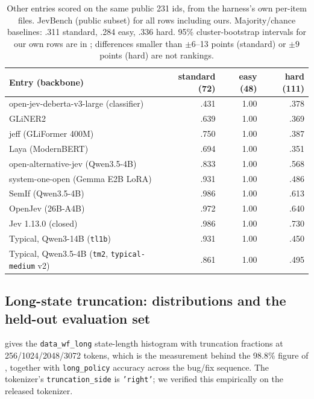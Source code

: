 \begin{table}[h]
  \centering
  \caption{Other entries scored on the same public 231 ids, from the harness's own per-item files.
  JevBench (public subset) for all rows including ours. Majority/chance baselines: .311
  standard, .284 easy, .336 hard. 95\% cluster-bootstrap intervals for our own rows are in
  ; differences smaller than $\pm6$--13 points (standard) or $\pm9$ points
  (hard) are not rankings.}
  \label{tab:app-leaderboard}
  \small
  \begin{tabular}{lrrr}
    \toprule
    Entry (backbone) & standard (72) & easy (48) & hard (111) \\
    \midrule
    open-jev-deberta-v3-large (classifier) & .431 & 1.00 & .378 \\
    GLiNER2 & .639 & 1.00 & .369 \\
    jeff (GLiFormer 400M) & .750 & 1.00 & .387 \\
    Laya (ModernBERT) & .694 & 1.00 & .351 \\
    open-alternative-jev (Qwen3.5-4B) & .833 & 1.00 & .568 \\
    system-one-open (Gemma E2B LoRA) & .931 & 1.00 & .486 \\
    SemIf (Qwen3.5-4B) & .986 & 1.00 & .613 \\
    OpenJev (26B-A4B) & .972 & 1.00 & .640 \\
    Jev 1.13.0 (closed) & .986 & 1.00 & .730 \\
    \midrule
    Typical, Qwen3-14B (\texttt{tl1b}) & .931 & 1.00 & .450 \\
    Typical, Qwen3.5-4B (\texttt{tm2}, \texttt{typical-medium} v2) & .861 & 1.00 & .495 \\
    \bottomrule
  \end{tabular}
\end{table}

\subsection{Long-state truncation: distributions and the held-out evaluation set}
\label{app:truncation}

 gives the \texttt{data\_wf\_long} state-length histogram with truncation fractions
at 256/1024/2048/3072 tokens, which is the measurement behind the 98.8\% figure of
, together with \texttt{long\_policy} accuracy across the bug/fix sequence. The
tokenizer's \texttt{truncation\_side} is \texttt{'right'}; we verified this empirically on the released
tokenizer.

